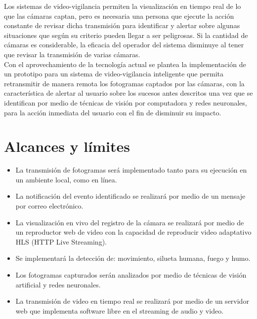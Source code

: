 Los sistemas de video-vigilancia permiten la visualización en tiempo real de lo que las cámaras captan, pero es necesaria una persona que ejecute la acción constante de revisar dicha transmisión para identificar y alertar sobre algunas situaciones que según su criterio pueden llegar a ser peligrosas. Si la cantidad de cámaras es considerable, la eficacia del operador del sistema disminuye al tener que revisar la transmisión de varias cámaras.\\

Con el aprovechamiento de la tecnología actual se plantea la implementación de un prototipo para un sistema de video-vigilancia inteligente que permita retransmitir de manera remota los fotogramas captados por las cámaras, con la característica de alertar al usuario sobre los sucesos antes descritos una vez que se identifican por medio de técnicas de visión por computadora y redes neuronales, para la acción inmediata del usuario con el fin de disminuir su impacto.

\section{Alcances y límites}
\begin{itemize}
    \item La transmisión de fotogramas será implementado tanto para su ejecución en un ambiente local, como en línea.
    \item La notificación del evento identificado se realizará por medio de un mensaje por correo electrónico.
    \item La visualización en vivo del registro de la cámara se realizará por medio de un reproductor web de video con la capacidad de reproducir video adaptativo HLS (HTTP Live Streaming).
    \item Se implementará la detección de: movimiento, silueta humana, fuego y humo.
    \item Los fotogramas capturados serán analizados por medio de técnicas de visión artificial y redes neuronales.
    \item La transmisión de video en tiempo real se realizará por medio de un servidor web que implementa software libre en el streaming de audio y video.
\end{itemize}